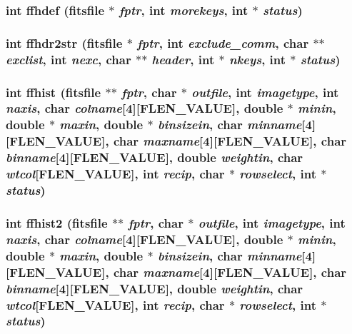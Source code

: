 \subsubsection{\setlength{\rightskip}{0pt plus 5cm}int ffhdef (\bf{fitsfile} $\ast$ {\em fptr}, int {\em morekeys}, int $\ast$ {\em status})}\label{fitsio__64_8h_628680d63bbae293fa53b48bdc0afbdd}


\subsubsection{\setlength{\rightskip}{0pt plus 5cm}int ffhdr2str (\bf{fitsfile} $\ast$ {\em fptr}, int {\em exclude\_\-comm}, char $\ast$$\ast$ {\em exclist}, int {\em nexc}, char $\ast$$\ast$ {\em header}, int $\ast$ {\em nkeys}, int $\ast$ {\em status})}\label{fitsio__64_8h_909b37f8894feb8f3e02d35dceee3f53}


\subsubsection{\setlength{\rightskip}{0pt plus 5cm}int ffhist (\bf{fitsfile} $\ast$$\ast$ {\em fptr}, char $\ast$ {\em outfile}, int {\em imagetype}, int {\em naxis}, char {\em colname}[4][FLEN\_\-VALUE], double $\ast$ {\em minin}, double $\ast$ {\em maxin}, double $\ast$ {\em binsizein}, char {\em minname}[4][FLEN\_\-VALUE], char {\em maxname}[4][FLEN\_\-VALUE], char {\em binname}[4][FLEN\_\-VALUE], double {\em weightin}, char {\em wtcol}[FLEN\_\-VALUE], int {\em recip}, char $\ast$ {\em rowselect}, int $\ast$ {\em status})}\label{fitsio__64_8h_abc1ac3fe3154b853aec9e8069a53104}


\subsubsection{\setlength{\rightskip}{0pt plus 5cm}int ffhist2 (\bf{fitsfile} $\ast$$\ast$ {\em fptr}, char $\ast$ {\em outfile}, int {\em imagetype}, int {\em naxis}, char {\em colname}[4][FLEN\_\-VALUE], double $\ast$ {\em minin}, double $\ast$ {\em maxin}, double $\ast$ {\em binsizein}, char {\em minname}[4][FLEN\_\-VALUE], char {\em maxname}[4][FLEN\_\-VALUE], char {\em binname}[4][FLEN\_\-VALUE], double {\em weightin}, char {\em wtcol}[FLEN\_\-VALUE], int {\em recip}, char $\ast$ {\em rowselect}, int $\ast$ {\em status})}\label{fitsio__64_8h_82fd106b8fa747b8b0895c6f1419c328}


